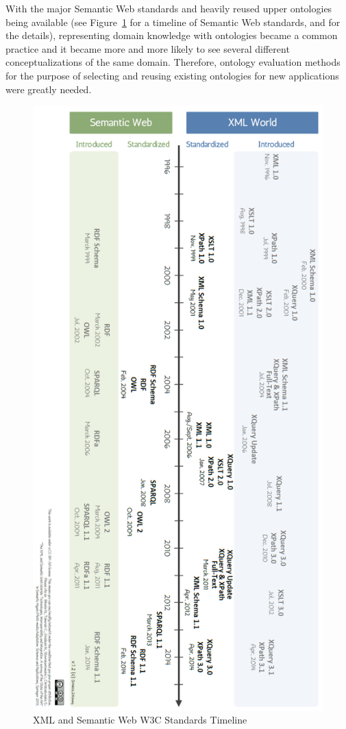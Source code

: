 With the major Semantic Web standards and heavily reused upper ontologies being available (see Figure~\ref{fig:timeline} for a timeline of Semantic Web standards, and \cite{bikakis2013xml} for the details), representing domain knowledge with ontologies became a common practice and it became more and more likely to see several different conceptualizations of the same domain. Therefore, ontology evaluation methods for the purpose of selecting and reusing existing ontologies for new applications were greatly needed.

\begin{figure}
	\centering
	\includegraphics[height=\textheight]{XMLSemanticWebW3CTimeline.png}
	\caption[XML and Semantic Web W3C Standards Timeline]{XML and Semantic Web W3C Standards Timeline}
	\label{fig:timeline}
\end{figure}

